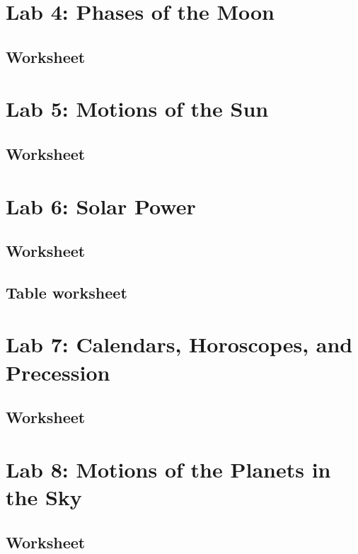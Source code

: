 \documentclass[12pt]{article}
\begin{document}
\newpage
\section{Lab 4: Phases of the Moon}\label{apx:lab_04}
\subsection{Worksheet}\label{apx:lab_04_ws}


\newpage
\section{Lab 5: Motions of the Sun}\label{apx:lab_05}
\subsection{Worksheet}\label{apx:lab_05_ws}


\newpage
\section{Lab 6: Solar Power}\label{apx:lab_06}
\subsection{Worksheet}\label{apx:lab_06_ws}


\newpage
\subsection{Table worksheet}\label{apx:lab_06_tb}

\newpage
\section{Lab 7: Calendars, Horoscopes, and Precession}\label{apx:lab_07}
\subsection{Worksheet}\label{apx:lab_07_ws}
%

\newpage
\section{Lab 8: Motions of the Planets in the Sky}\label{apx:lab_08}
\subsection{Worksheet}\label{apx:lab_08_ws}
%
\end{document}
